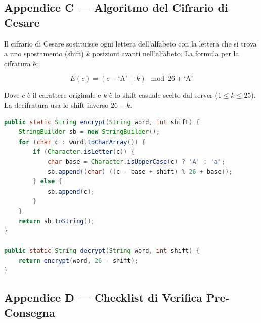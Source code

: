 \documentclass[12pt, a4paper]{article}
\begin{document}
\subsection{Appendice C — Algoritmo del Cifrario di Cesare}

Il cifrario di Cesare sostituisce ogni lettera dell'alfabeto con la lettera che si trova a uno spostamento (shift) $k$ posizioni avanti nell'alfabeto. La formula per la cifratura è:

\[
    E(c) = (c - \text{`A'} + k) \mod 26 + \text{`A'}
\]

Dove $c$ è il carattere originale e $k$ è lo shift casuale scelto dal server ($1 \leq k \leq 25$). La decifratura usa lo shift inverso $26 - k$.

\begin{lstlisting}[language=Java, caption={Esempio di implementazione Java del cifrario di Cesare}]
public static String encrypt(String word, int shift) {
    StringBuilder sb = new StringBuilder();
    for (char c : word.toCharArray()) {
        if (Character.isLetter(c)) {
            char base = Character.isUpperCase(c) ? 'A' : 'a';
            sb.append((char) ((c - base + shift) % 26 + base));
        } else {
            sb.append(c);
        }
    }
    return sb.toString();
}

public static String decrypt(String word, int shift) {
    return encrypt(word, 26 - shift);
}
\end{lstlisting}

\subsection{Appendice D — Checklist di Verifica Pre-Consegna}
\end{document}
